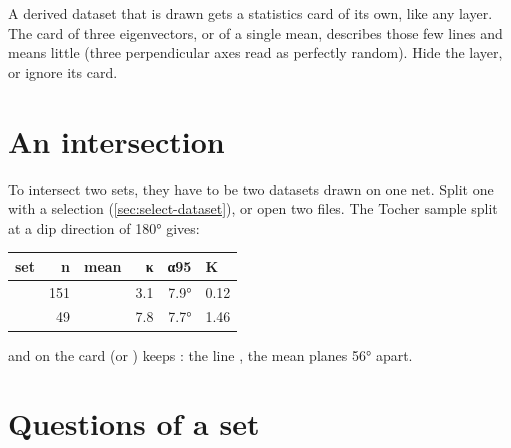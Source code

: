 \begin{note}
A derived dataset that is drawn gets a statistics card of its own, like any layer. The card of three
eigenvectors, or of a single mean, describes those few lines and means little (three perpendicular axes
read as perfectly random). Hide the layer, or ignore its card.
\end{note}

\section{An intersection}\label{sec:stats-intersect}


To intersect two sets, they have to be two datasets drawn on one net. Split one with a selection
(\cref{sec:select-dataset}), or open two files. The Tocher sample split at a dip direction of 180°
gives:

\begin{center}\small
\begin{tabularx}{\linewidth}{@{}lrlrrL@{}}\toprule
\sffamily\bfseries set & \sffamily\bfseries n & \sffamily\bfseries mean & \sffamily\bfseries κ & \sffamily\bfseries α95 & \sffamily\bfseries K \\\midrule
{} & 151 &  & 3.1 & 7.9° & 0.12 \\
 & 49 &  & 7.8 & 7.7° & 1.46 \\
\bottomrule\end{tabularx}
\end{center}

and  on the  card (or ) keeps : the line
, the mean planes 56° apart.

\section{Questions of a set}\label{sec:stats-tests}

